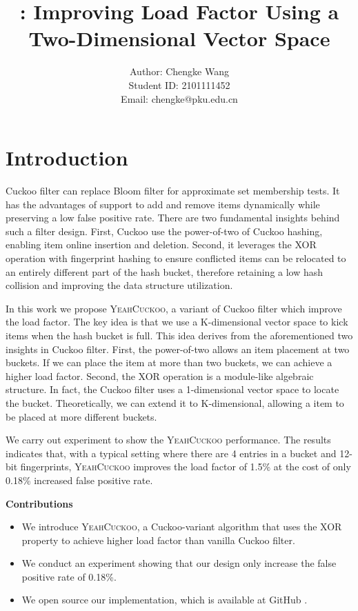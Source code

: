 \documentclass[11pt]{IEEEtran}
\title{\sys: Improving Load Factor Using a Two-Dimensional Vector Space}
\author{Author: Chengke Wang \\
Student ID: 2101111452 \\ 
Email: chengke@pku.edu.cn}
\newcommand{\nosection}[1]{\vspace{3pt}\noindent\textbf{#1}}
\newcommand{\sys}{\textsc{YeahCuckoo}\xspace}
\begin{document}
\maketitle

\section{Introduction}

Cuckoo filter \cite{cuckoo} can replace Bloom filter \cite{bloom} for approximate set membership tests. It has the advantages of support to add and remove items dynamically while preserving a low false positive rate. There are two fundamental insights behind such a filter design. First, Cuckoo use the power-of-two of Cuckoo hashing, enabling item online insertion and deletion. Second, it leverages the XOR operation with fingerprint hashing to ensure conflicted items can be relocated to an entirely different part of the hash bucket, therefore retaining a low hash collision and improving the data structure utilization. 

In this work we propose \sys, a variant of Cuckoo filter which improve the load factor. The key idea is that we use a K-dimensional vector space to kick items when the hash bucket is full. This idea derives from the aforementioned two insights in Cuckoo filter. First, the power-of-two allows an item placement at two buckets. If we can place the item at more than two buckets, we can achieve a higher load factor. Second, the XOR operation is a module-like algebraic structure. In fact, the Cuckoo filter uses a 1-dimensional vector space to locate the bucket. Theoretically, we can extend it to K-dimensional, allowing a item to be placed at more different buckets.

We carry out experiment to show the \sys performance. The results indicates that, with a typical setting where there are 4 entries in a bucket and 12-bit fingerprints, \sys improves the load factor of 1.5\% at the cost of only 0.18\% increased false positive rate.

\nosection{Contributions}
\begin{itemize}
	\item We introduce \sys, a Cuckoo-variant algorithm that uses the XOR property to achieve higher load factor than vanilla Cuckoo filter. 
	\item We conduct an experiment showing that our design only increase the false positive rate of 0.18\%.
	\item We open source our implementation, which is available at GitHub \cite{yeah}.
\end{itemize}
\end{document}
